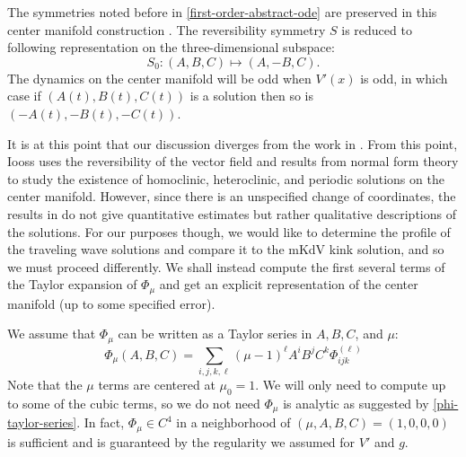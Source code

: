 The symmetries noted before in \cref{first-order-abstract-ode} are preserved in this center manifold construction \cite{vanderbauwhede1992center}. The reversibility symmetry \(S\) is reduced to following representation on the three-dimensional subspace:
\begin{equation*}
	S_0: (A, B, C) \mapsto (A, -B, C).
\end{equation*}
The dynamics on the center manifold will be odd when \(V'(x)\) is odd, in which case if  \((A(t),B(t),C(t))\) is a solution then so is \((-A(t), -B(t), -C(t))\).

It is at this point that our discussion diverges from the work in \cite{iooss2000travelling}. From this point, Iooss uses the reversibility of the vector field and results from normal form theory to study the existence of homoclinic, heteroclinic, and periodic solutions on the center manifold. However, since there is an unspecified change of coordinates, the results in \cite{iooss2000travelling} do not give quantitative estimates but rather qualitative descriptions of the solutions. For our purposes though, we would like to determine the profile of the traveling wave solutions and compare it to the mKdV kink solution, and so we must proceed differently. We shall instead compute the first several terms of the Taylor expansion of \(\Phi_\mu\) and get an explicit representation of the center manifold (up to some specified error).


We assume that \(\Phi_\mu\) can be written as a Taylor series in \(A,B,C\), and \(\mu\):
\begin{equation}\label{phi-taylor-series}
	\Phi_\mu(A,B,C) = \sum_{i,j,k,\ell} (\mu - 1)^\ell A^i B^j C^k \Phi^{(\ell)}_{ijk} 
\end{equation}
Note that the \(\mu\) terms are centered at \(\mu_0 = 1\). We will only need to compute up to some of the cubic terms, so we do not need \(\Phi_\mu\) is analytic as suggested by \cref{phi-taylor-series}. In fact, \(\Phi_\mu \in C^4\) in a neighborhood of \((\mu, A, B, C) = (1,0,0,0)\) is sufficient and is guaranteed by the regularity we assumed for \(V'\) and \(g\).

